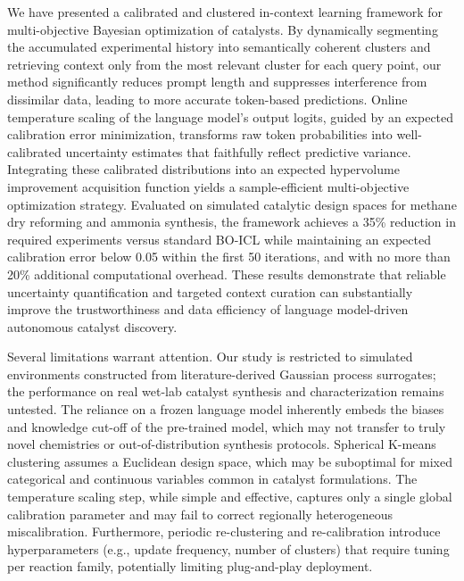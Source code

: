 \documentclass{article}
\begin{document}
We have presented a calibrated and clustered in-context learning framework for multi-objective Bayesian optimization of catalysts. By dynamically segmenting the accumulated experimental history into semantically coherent clusters and retrieving context only from the most relevant cluster for each query point, our method significantly reduces prompt length and suppresses interference from dissimilar data, leading to more accurate token-based predictions. Online temperature scaling of the language model's output logits, guided by an expected calibration error minimization, transforms raw token probabilities into well-calibrated uncertainty estimates that faithfully reflect predictive variance. Integrating these calibrated distributions into an expected hypervolume improvement acquisition function yields a sample-efficient multi-objective optimization strategy. Evaluated on simulated catalytic design spaces for methane dry reforming and ammonia synthesis, the framework achieves a 35\% reduction in required experiments versus standard BO-ICL while maintaining an expected calibration error below 0.05 within the first 50 iterations, and with no more than 20\% additional computational overhead. These results demonstrate that reliable uncertainty quantification and targeted context curation can substantially improve the trustworthiness and data efficiency of language model-driven autonomous catalyst discovery.

Several limitations warrant attention. Our study is restricted to simulated environments constructed from literature-derived Gaussian process surrogates; the performance on real wet-lab catalyst synthesis and characterization remains untested. The reliance on a frozen language model inherently embeds the biases and knowledge cut-off of the pre-trained model, which may not transfer to truly novel chemistries or out-of-distribution synthesis protocols. Spherical K-means clustering assumes a Euclidean design space, which may be suboptimal for mixed categorical and continuous variables common in catalyst formulations. The temperature scaling step, while simple and effective, captures only a single global calibration parameter and may fail to correct regionally heterogeneous miscalibration. Furthermore, periodic re-clustering and re-calibration introduce hyperparameters (e.g., update frequency, number of clusters) that require tuning per reaction family, potentially limiting plug-and-play deployment.
\end{document}

